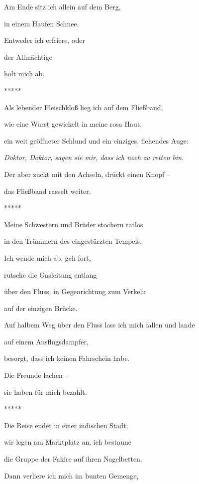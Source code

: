 \documentclass[a4paper]{article}
\begin{document}
Am Ende sitz ich allein auf dem Berg,

in einem Haufen Schnee.

Entweder ich erfriere, oder

der Allmächtige

holt mich ab.


\bigskip

*****


\bigskip

Als lebender Fleischkloß lieg ich auf dem Fließband,

wie eine Wurst gewickelt in meine rosa Haut;

ein weit geöffneter Schlund und ein einziges, flehendes Auge:

{\itshape
Doktor, Doktor, sagen sie mir, dass ich noch zu retten bin.}

Der aber zuckt mit den Achseln, drückt einen Knopf –

das Fließband rasselt weiter.


\bigskip

*****


\bigskip

Meine Schwestern und Brüder stochern ratlos 

in den Trümmern des eingestürzten Tempels.

Ich wende mich ab, geh fort, 

rutsche die Gasleitung entlang

über den Fluss, in Gegenrichtung zum Verkehr

auf der einzigen Brücke.


\bigskip

Auf halbem Weg über den Fluss lass ich mich fallen und lande

auf einem Ausflugsdampfer,

besorgt, dass ich keinen Fahrschein habe.

Die Freunde lachen – 

sie haben für mich bezahlt.


\bigskip

*****


\bigskip


\bigskip

Die Reise endet in einer indischen Stadt;

wir legen am Marktplatz an, ich bestaune

die Gruppe der Fakire auf ihren Nagelbetten.

Dann verliere ich mich im bunten Gemenge,
\end{document}
